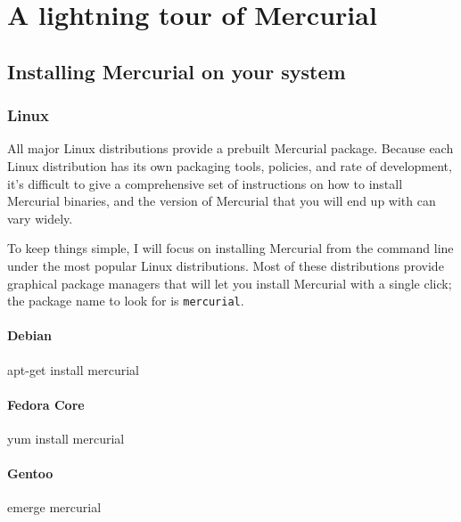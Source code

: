 \chapter{A lightning tour of Mercurial}
\label{chap:tour}

\section{Installing Mercurial on your system}
\label{sec:tour:install}

\subsection{Linux}

All major Linux distributions provide a prebuilt Mercurial package.
Because each Linux distribution has its own packaging tools, policies,
and rate of development, it's difficult to give a comprehensive set of
instructions on how to install Mercurial binaries, and the version of
Mercurial that you will end up with can vary widely.  

To keep things simple, I will focus on installing Mercurial from the
command line under the most popular Linux distributions.  Most of
these distributions provide graphical package managers that will let
you install Mercurial with a single click; the package name to look
for is \texttt{mercurial}.

\subsubsection{Debian}

\begin{codesample2}
  apt-get install mercurial
\end{codesample2}

\subsubsection{Fedora Core}

\begin{codesample2}
  yum install mercurial
\end{codesample2}

\subsubsection{Gentoo}

\begin{codesample2}
  emerge mercurial
\end{codesample2}

